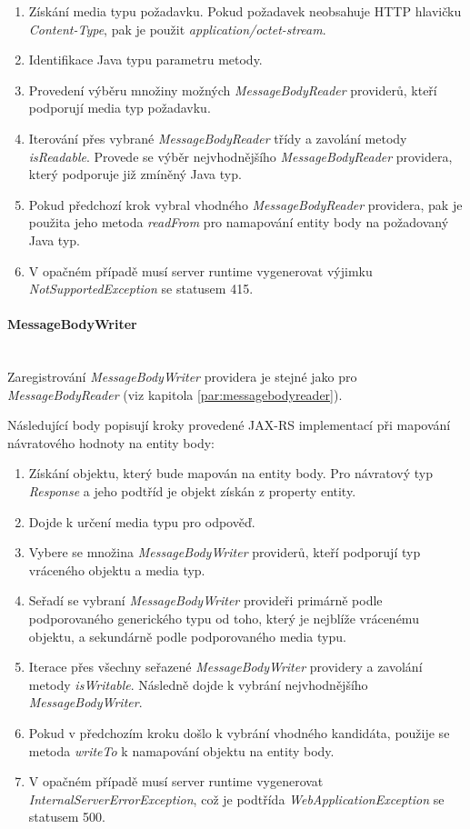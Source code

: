 \documentclass[11pt,twoside,a4paper]{book}
\begin{document}
\begin{enumerate}
  \item Získání media typu požadavku. Pokud požadavek neobsahuje HTTP hlavičku
{\em Content-Type}, pak je použit {\em application/octet-stream}.
  \item Identifikace Java typu parametru metody.
  \item Provedení výběru množiny možných {\em MessageBodyReader} providerů,
  kteří podporují media typ požadavku.
  \item Iterování přes vybrané {\em MessageBodyReader} třídy a zavolání metody
  {\em isReadable}.
Provede se výběr nejvhodnějšího {\em MessageBodyReader} providera, který
podporuje již zmíněný Java typ.
  \item Pokud předchozí krok vybral vhodného {\em MessageBodyReader} providera,
  pak je použita jeho metoda {\em readFrom} pro namapování entity body na
  požadovaný Java typ.
  \item V opačném případě musí server runtime vygenerovat výjimku {\em
  NotSupportedException} se statusem 415.
\end{enumerate}

\paragraph{MessageBodyWriter}
\mbox{}\\

Zaregistrování {\em MessageBodyWriter} providera je stejné jako pro
{\em MessageBodyReader} (viz kapitola \ref{par:messagebodyreader}).

Následující body popisují kroky provedené JAX-RS implementací při mapování
návratového hodnoty na entity body:

\begin{enumerate}
  \item Získání objektu, který bude mapován na entity body. Pro návratový typ {\em Response} a
jeho podtříd je objekt získán z property entity.
  \item Dojde k určení media typu pro odpověď.
  \item Vybere se množina {\em MessageBodyWriter} providerů, kteří podporují typ
  vráceného objektu a media typ.
  \item Seřadí se vybraní {\em MessageBodyWriter} provideři primárně podle
  podporovaného generického typu od toho, který je nejblíže vrácenému objektu, a
  sekundárně podle podporovaného media typu.
  \item Iterace přes všechny seřazené {\em MessageBodyWriter} providery a
  zavolání metody {\em isWritable}. Následně dojde k vybrání nejvhodnějšího
  {\em MessageBodyWriter}.
  \item Pokud v předchozím kroku došlo k vybrání vhodného kandidáta, použije se
metoda {\em writeTo} k namapování objektu na entity body.
  \item V opačném případě musí server runtime vygenerovat {\em
  InternalServerErrorException}, což je podtřída {\em WebApplicationException}
  se statusem 500.
\end{enumerate}
\end{document}
